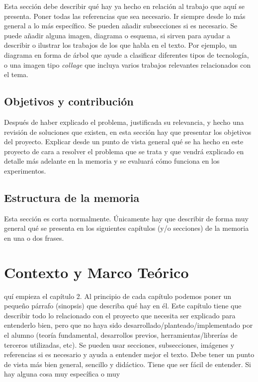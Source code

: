 \documentclass[a4paper,11pt,reqno,twoside]{memoir}
\begin{document}
Esta sección debe describir qué hay ya hecho en relación al trabajo que aquí se presenta. Poner todas las referencias que sea necesario. Ir siempre desde lo más general a lo más específico. Se pueden añadir subsecciones si es necesario. Se puede añadir alguna imagen, diagrama o esquema, si sirven para ayudar a describir o ilustrar los trabajos de los que habla en el texto. Por ejemplo, un diagrama en forma de árbol que ayude a clasificar diferentes tipos de tecnología, o una imagen tipo \textit{collage} que incluya varios trabajos relevantes relacionados con el tema.

\section{Objetivos y contribución}
\label{sec:objetivos_contribucion}

Después de haber explicado el problema, justificada su relevancia, y hecho una revisión de soluciones que existen, en esta sección hay que presentar los objetivos del proyecto. Explicar desde un punto de vista general qué se ha hecho en este proyecto de cara a resolver el problema que se trata y que vendrá explicado en detalle más adelante en la memoria y se evaluará cómo funciona en los experimentos.

\section{Estructura de la memoria}
\label{sec:estructura_memoria}

Esta sección es corta normalmente. Únicamente hay que describir de forma muy general qué se presenta en los siguientes capítulos (y/o secciones) de la memoria en una o dos frases.

\clearemptydoublepage
\chapter{Contexto y Marco Teórico}
\label{sec:contexto_marco_teorico}
\minitoc
\vspace{1cm}
quí empieza el capítulo 2. Al principio de cada capítulo podemos poner un pequeño párrafo (sinopsis) que describa qué hay en él. Este capítulo tiene que describir todo lo relacionado con el proyecto que necesita ser explicado para entenderlo bien, pero que no haya sido desarrollado/planteado/implementado por el alumno (teoría fundamental, desarrollos previos, herramientas/librerías de terceros utilizadas, etc). Se pueden usar secciones, subsecciones, imágenes y referencias si es necesario y ayuda a entender mejor el texto. Debe tener un punto de vista más bien general, sencillo y didáctico. Tiene que ser fácil de entender. Si hay alguna cosa muy específica o muy 
\newpage
\end{document}
